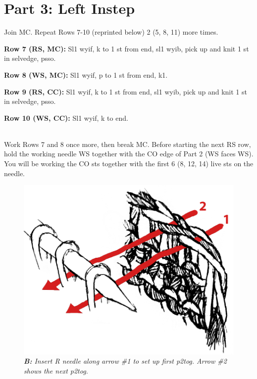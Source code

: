 \documentclass[12pt]{article}
\newcommand{\rowDir}[1]{\textbf{#1:}} %
\begin{document}

\section*{Part 3: Left Instep}

Join MC. Repeat Rows 7-10 (reprinted below) 2 (5, 8, 11) more times.

\rowDir{Row 7 (RS, MC)} Sl1 wyif, k to 1 st from end, sl1 wyib, pick up and knit 1 st in selvedge, psso.

\rowDir{Row 8 (WS, MC)} Sl1 wyif, p to 1 st from end, k1.

\rowDir{Row 9 (RS, CC)} Sl1 wyif, k to 1 st from end, sl1 wyib, pick up and knit 1 st in selvedge, psso.

\rowDir{Row 10 (WS, CC)} Sl1 wyif, k to end.

~\\
Work Rows 7 and 8 once more, then break MC. Before starting the next RS row, hold the working needle WS together with the CO edge of Part 2 (WS faces WS). You will be working the CO sts together with the first 6 (8, 12, 14) live sts on the needle.

\begin{figure}
\vspace{-2em}
\includegraphics[width=\linewidth]{./diagrams/pickupCO.png}
\emph{\small \textbf{B:} Insert R needle along arrow \#1 to set up first p2tog. Arrow \#2 shows the next p2tog.}
\vspace{-1em}
\end{figure} \leavevmode
\end{document}
